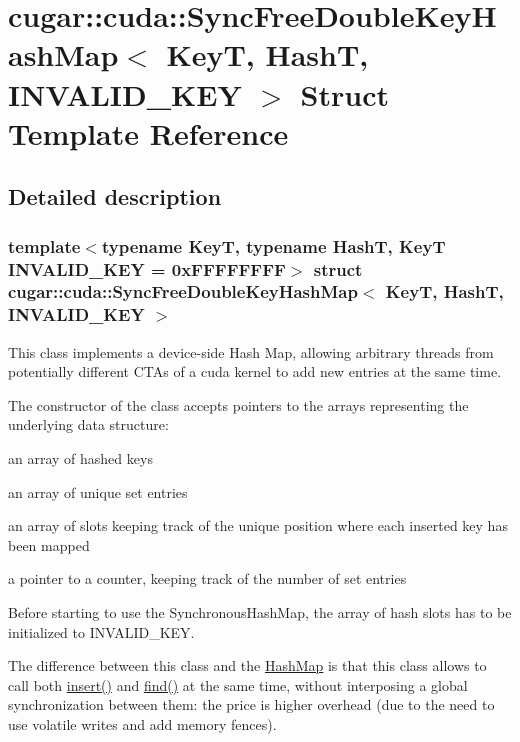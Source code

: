 \hypertarget{structcugar_1_1cuda_1_1_sync_free_double_key_hash_map}{}\section{cugar\+:\+:cuda\+:\+:Sync\+Free\+Double\+Key\+Hash\+Map$<$ KeyT, HashT, I\+N\+V\+A\+L\+I\+D\+\_\+\+K\+EY $>$ Struct Template Reference}
\label{structcugar_1_1cuda_1_1_sync_free_double_key_hash_map}


\subsection{Detailed description}
\subsubsection*{template$<$typename KeyT, typename HashT, KeyT I\+N\+V\+A\+L\+I\+D\+\_\+\+K\+EY = 0x\+F\+F\+F\+F\+F\+F\+FF$>$\newline
struct cugar\+::cuda\+::\+Sync\+Free\+Double\+Key\+Hash\+Map$<$ Key\+T, Hash\+T, I\+N\+V\+A\+L\+I\+D\+\_\+\+K\+E\+Y $>$}

This class implements a device-\/side Hash Map, allowing arbitrary threads from potentially different C\+T\+As of a cuda kernel to add new entries at the same time.

The constructor of the class accepts pointers to the arrays representing the underlying data structure\+:


\begin{DoxyItemize}
\item an array of hashed keys
\item an array of unique set entries
\item an array of slots keeping track of the unique position where each inserted key has been mapped
\item a pointer to a counter, keeping track of the number of set entries
\end{DoxyItemize}

Before starting to use the Synchronous\+Hash\+Map, the array of hash slots has to be initialized to I\+N\+V\+A\+L\+I\+D\+\_\+\+K\+EY.

The difference between this class and the \hyperlink{structcugar_1_1cuda_1_1_hash_map}{Hash\+Map} is that this class allows to call both \hyperlink{structcugar_1_1cuda_1_1_sync_free_double_key_hash_map_aa271c313d2699e73a772d37c8bc8bfa9}{insert()} and \hyperlink{structcugar_1_1cuda_1_1_sync_free_double_key_hash_map_a279f94f0e11b195b974a74cf1b1c84ba}{find()} at the same time, without interposing a global synchronization between them\+: the price is higher overhead (due to the need to use volatile writes and add memory fences). 

